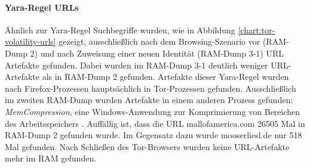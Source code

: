 \paragraph*{Yara-Regel \glqq{}URLs\grqq{}}
Ähnlich zur Yara-Regel \glqq{}Suchbegriffe\grqq{} wurden, wie in Abbildung \ref{chart:tor-volatility-urls} gezeigt, ausschließlich nach dem Browsing-Szenario vor (RAM-Dump 2) und nach Zuweisung einer neuen Identität (RAM-Dump 3-1) URL Artefakte gefunden. Dabei wurden im RAM-Dump 3-1 deutlich weniger URL-Artefakte als in RAM-Dump 2 gefunden. 
Artefakte dieser Yara-Regel wurden nach Firefox-Prozessen hauptsächlich in Tor-Prozessen gefunden. 
Ausschließlich im zweiten RAM-Dump wurden Artefakte in einem anderen Prozess gefunden: \textit{MemCompression}, eine Windows-Anwendung zur Komprimierung von Bereichen des Arbeitsspeichers \cite{MemCompressionWebsite}.
Auffällig ist, dass die URL \glqq{}mallofamerica.com\grqq{} 26505 Mal in RAM-Dump 2 gefunden wurde. Im Gegensatz dazu wurde \glqq{}mooserliesl.de\grqq{} nur 518 Mal gefunden. Nach Schließen des Tor-Browsers wurden keine URL-Artefakte mehr im RAM gefunden.
